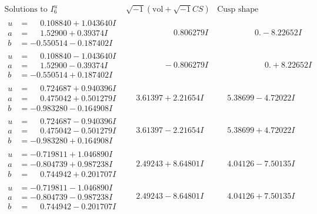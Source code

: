 \documentclass[1p]{elsarticle_modified}
\theoremstyle{definition}
\newcommand{\I}{\sqrt{-1}}
\begin{document}
$$\begin{array}{c|c|c}  
\text{Solutions to }I^u_{6}& \I (\text{vol} + \sqrt{-1}CS) & \text{Cusp shape}\\
 \hline 
\begin{aligned}
u &= \phantom{-}0.108840 + 1.043640 I \\
a &= \phantom{-}1.52900 + 0.39374 I \\
b &= -0.550514 - 0.187402 I\end{aligned}
 & \phantom{-0.000000 -}0.806279 I & \phantom{-0.000000 } 0. - 8.22652 I \\ \hline\begin{aligned}
u &= \phantom{-}0.108840 - 1.043640 I \\
a &= \phantom{-}1.52900 - 0.39374 I \\
b &= -0.550514 + 0.187402 I\end{aligned}
 & \phantom{-0.000000 } -0.806279 I & \phantom{-0.000000 -}0. + 8.22652 I \\ \hline\begin{aligned}
u &= \phantom{-}0.724687 + 0.940396 I \\
a &= \phantom{-}0.475042 + 0.501279 I \\
b &= -0.983280 - 0.164908 I\end{aligned}
 & \phantom{-}3.61397 + 2.21654 I & \phantom{-}5.38699 - 4.72022 I \\ \hline\begin{aligned}
u &= \phantom{-}0.724687 - 0.940396 I \\
a &= \phantom{-}0.475042 - 0.501279 I \\
b &= -0.983280 + 0.164908 I\end{aligned}
 & \phantom{-}3.61397 - 2.21654 I & \phantom{-}5.38699 + 4.72022 I \\ \hline\begin{aligned}
u &= -0.719811 + 1.046890 I \\
a &= -0.804739 + 0.987238 I \\
b &= \phantom{-}0.744942 + 0.201707 I\end{aligned}
 & \phantom{-}2.49243 + 8.64801 I & \phantom{-}4.04126 - 7.50135 I \\ \hline\begin{aligned}
u &= -0.719811 - 1.046890 I \\
a &= -0.804739 - 0.987238 I \\
b &= \phantom{-}0.744942 - 0.201707 I\end{aligned}
 & \phantom{-}2.49243 - 8.64801 I & \phantom{-}4.04126 + 7.50135 I \\ \hline\begin{aligned}

\end{aligned}
\end{array}$$
\end{document}
